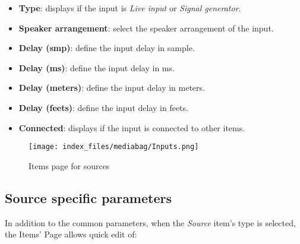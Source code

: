\documentclass[
  letterpaper,
  DIV=11,
  numbers=noendperiod]{scrreport}
\providecommand{\tightlist}{%
  \setlength{\itemsep}{0pt}\setlength{\parskip}{0pt}}\usepackage{longtable,booktabs,array}
\begin{document}
\begin{itemize}
\tightlist
\item
  \textbf{Type}: displays if the input is \emph{Live input} or
  \emph{Signal generator}.
\item
  \textbf{Speaker arrangement}: select the speaker arrangement of the
  input.
\item
  \textbf{Delay (smp)}: define the input delay in sample.
\item
  \textbf{Delay (ms)}: define the input delay in ms.
\item
  \textbf{Delay (meters)}: define the input delay in meters.
\item
  \textbf{Delay (feets)}: define the input delay in feets.
\item
  \textbf{Connected}: displays if the input is connected to other items.
\end{itemize}

\begin{figure}

{\centering \texttt{[image: index\_files/mediabag/Inputs.png]}

}

\caption{Items page for sources}

\end{figure}

\hypertarget{source-specific-parameters}{%
\subsection{Source specific
parameters}\label{source-specific-parameters}}

In addition to the common parameters, when the \emph{Source} item's type
is selected, the Items' Page allows quick edit of:
\end{document}
